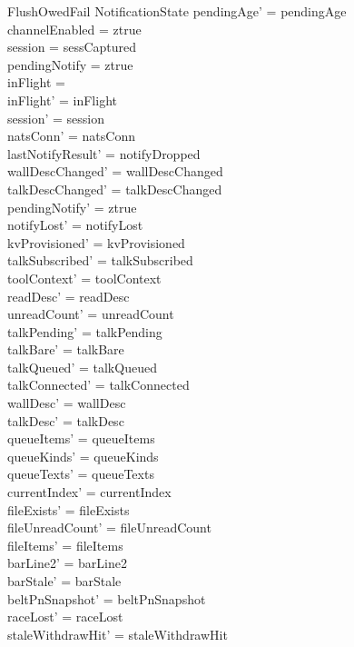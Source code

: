 \documentclass[a4paper,10pt,fleqn]{article}
\begin{document}
\begin{schema}{FlushOwedFail}
  \Delta NotificationState
  \where
  pendingAge' = pendingAge \\
  channelEnabled = ztrue \\
  session = sessCaptured \\
  pendingNotify = ztrue \\
  inFlight = \emptyset \\
  inFlight' = inFlight \\
  session' = session \\
  natsConn' = natsConn \\
  lastNotifyResult' = notifyDropped \\
  wallDescChanged' = wallDescChanged \\
  talkDescChanged' = talkDescChanged \\
  pendingNotify' = ztrue \\
  notifyLost' = notifyLost \\
  kvProvisioned' = kvProvisioned \\
  talkSubscribed' = talkSubscribed \\
  toolContext' = toolContext \\
  readDesc' = readDesc \\
  unreadCount' = unreadCount \\
  talkPending' = talkPending \\
  talkBare' = talkBare \\
  talkQueued' = talkQueued \\
  talkConnected' = talkConnected \\
  wallDesc' = wallDesc \\
  talkDesc' = talkDesc \\
  queueItems' = queueItems \\
  queueKinds' = queueKinds \\
  queueTexts' = queueTexts \\
  currentIndex' = currentIndex \\
  fileExists' = fileExists \\
  fileUnreadCount' = fileUnreadCount \\
  fileItems' = fileItems \\
  barLine2' = barLine2 \\
  barStale' = barStale \\
  beltPnSnapshot' = beltPnSnapshot \\
  raceLost' = raceLost \\
  staleWithdrawHit' = staleWithdrawHit \\

\end{schema}
\end{document}
